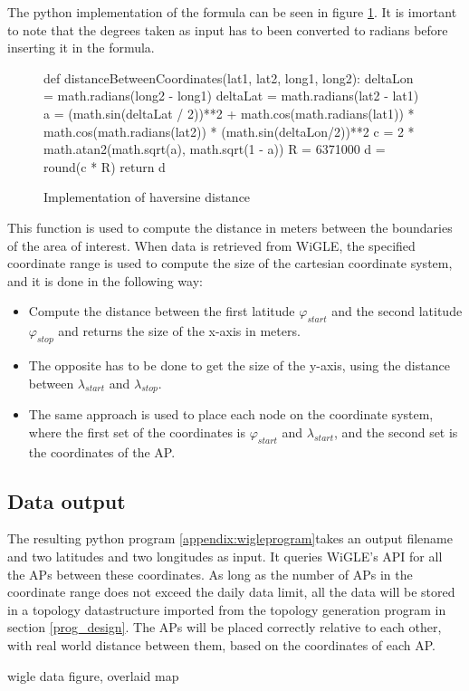The python implementation of the formula can be seen in figure \ref{fig:haversine}. It is imortant to note that the degrees taken as input
has to been converted to radians before inserting it in the formula. 

	\begin{figure}[H]
		\tiny
		\begin{python}
def distanceBetweenCoordinates(lat1, lat2, long1, long2):
	deltaLon = math.radians(long2 - long1)
	deltaLat = math.radians(lat2 - lat1)
	a = (math.sin(deltaLat / 2))**2 + math.cos(math.radians(lat1)) * math.cos(math.radians(lat2)) * (math.sin(deltaLon/2))**2
	c = 2 * math.atan2(math.sqrt(a), math.sqrt(1 - a)) 
	R = 6371000
	d = round(c * R)
	return d
	\end{python}
			\caption{Implementation of haversine distance}
			\label{fig:haversine}
	\end{figure}


This function is used to compute the distance in meters between the boundaries of the area of interest. When data is retrieved from
WiGLE, the specified coordinate range is used to compute the size of the cartesian coordinate system, and it is done in the following way:
\begin{itemize}
	\item Compute the distance between the first latitude $\varphi_{start}$ and the second latitude $\varphi_{stop}$ and returns the size of the x-axis in meters.
	\item The opposite has to be done to get the size of the y-axis, using the distance between $\lambda_{start}$ and $\lambda_{stop}$. 
	\item The same approach is used to place each node on the coordinate system, where the first set of the coordinates is
$\varphi_{start}$ and $\lambda_{start}$, and the second set is the coordinates of the AP.

\end{itemize}
\subsection{Data output}
The resulting python program \ref{appendix:wigleprogram}takes an output filename and two latitudes and two longitudes as input. It queries WiGLE's API for all the APs between these coordinates.
As long as the number of APs in the coordinate range does not exceed the daily data limit, all the data will be stored in a topology datastructure imported 
from the topology generation program in section \ref{prog_design}. The APs will be placed correctly relative to each other, with real world distance between them,
based on the coordinates of each AP. 

{{wigle data figure, overlaid map}}

